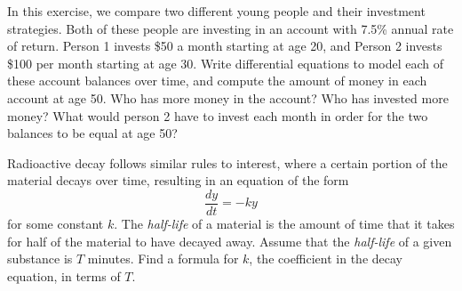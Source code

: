 \documentclass{ximera}
\begin{document}
\begin{exercise}
    In this exercise, we compare two different young people and their investment strategies. Both of these people are investing in an account with 7.5\% annual rate of return. Person 1 invests \$50 a month starting at age 20, and Person 2 invests \$100 per month starting at age 30. Write differential equations to model each of these account balances over time, and compute the amount of money in each account at age 50. Who has more money in the account? Who has invested more money? What would person 2 have to invest each month in order for the two balances to be equal at age 50?
\end{exercise}

\begin{exercise}
Radioactive decay follows similar rules to interest, where a certain portion of the material decays over time, resulting in an equation of the form 
\[ 
    \frac{dy}{dt} = -ky 
\] 
for some constant $k$. The \emph{half-life} of a material is the amount of time that it takes for half of the material to have decayed away. Assume that the \emph{half-life} of a given substance is $T$ minutes. Find a formula for $k$, the coefficient in the decay equation, in terms of $T$.
\end{exercise}

\end{document}
